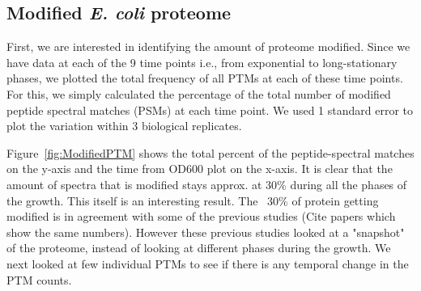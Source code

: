 \documentclass[12pt]{article}
\begin{document}


\subsection{Modified \emph{E. coli} proteome}
First, we are interested in identifying the amount of proteome modified. Since we have data at each of the 9 time points i.e., from exponential to long-stationary phases, we plotted the total frequency of all PTMs at each of these time points. For this, we simply calculated the percentage of the total number of modified peptide spectral matches (PSMs) at each time point. We used 1 standard error to plot the variation within 3 biological replicates.

Figure~\ref{fig:ModifiedPTM} shows the total percent of the peptide-spectral matches on the y-axis and the time from OD600 plot on the x-axis. It is clear that the amount of spectra that is modified stays approx. at 30\% during all the phases of the growth. This itself is an interesting result. The ~30\% of protein getting modified is in agreement with some of the previous studies (Cite papers which show the same numbers). However these previous studies looked at a "snapshot" of the proteome, instead of looking at different phases during the growth. We next looked at few individual PTMs to see if there is any temporal change in the PTM counts. 
\end{document}
